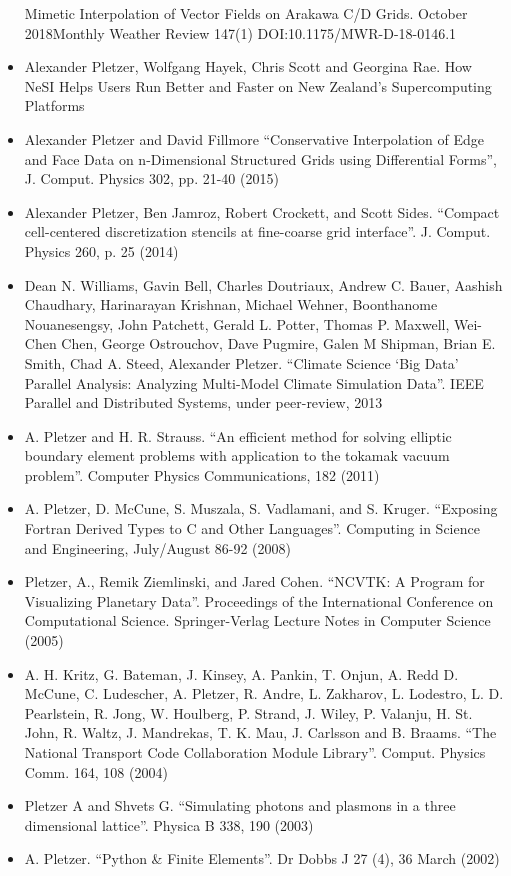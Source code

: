 \documentclass[10pt,a4paper]{altacv}
\begin{document}
\begin{itemize}
Mimetic Interpolation of Vector Fields on Arakawa C/D Grids. October 2018Monthly Weather Review 147(1)
DOI:10.1175/MWR-D-18-0146.1
   \item Alexander Pletzer, Wolfgang Hayek, Chris Scott and Georgina Rae.
How NeSI Helps Users Run Better and Faster on New Zealand's Supercomputing Platforms
\item Alexander Pletzer and David Fillmore “Conservative Interpolation of Edge and Face Data on n-Dimensional Structured Grids using Differential Forms”, J. Comput. Physics 302,  pp. 21-40 (2015)
\item Alexander Pletzer, Ben Jamroz, Robert Crockett, and Scott Sides. “Compact cell-centered discretization stencils at fine-coarse grid interface”. J. Comput. Physics 260, p. 25 (2014)
\item Dean N. Williams, Gavin Bell, Charles Doutriaux, Andrew C. Bauer, Aashish Chaudhary, Harinarayan Krishnan, Michael Wehner, Boonthanome Nouanesengsy, John Patchett, Gerald L. Potter, Thomas P. Maxwell, Wei-Chen Chen, George Ostrouchov, Dave Pugmire, Galen M Shipman, Brian E. Smith, Chad A. Steed, Alexander Pletzer. “Climate Science ‘Big Data’ Parallel Analysis: Analyzing Multi-Model Climate Simulation Data”. IEEE Parallel and Distributed Systems, under peer-review, 2013
\item A. Pletzer and H. R. Strauss. “An efficient method for solving elliptic boundary element problems with application to the tokamak vacuum problem”. Computer Physics Communications, 182 (2011)
\item A. Pletzer, D. McCune, S. Muszala, S. Vadlamani, and S. Kruger. “Exposing Fortran Derived Types to C and Other Languages”. Computing in Science and Engineering, July/August 86-92 (2008)
\item Pletzer, A., Remik Ziemlinski, and Jared Cohen. “NCVTK: A Program for Visualizing Planetary Data”. Proceedings of the International Conference on Computational Science. Springer-Verlag Lecture Notes in Computer Science (2005)
\item A. H. Kritz, G. Bateman, J. Kinsey, A. Pankin, T. Onjun, A. Redd D. McCune, C. Ludescher, A. Pletzer, R. Andre, L. Zakharov, L. Lodestro, L. D. Pearlstein, R. Jong, W. Houlberg, P. Strand, J. Wiley, P. Valanju, H. St. John, R. Waltz, J. Mandrekas, T. K. Mau, J. Carlsson and B. Braams. “The National Transport Code Collaboration Module Library”. Comput. Physics Comm. 164, 108 (2004)
\item Pletzer A and Shvets G. “Simulating photons and plasmons in a three dimensional lattice”. Physica B 338, 190 (2003)
\item A. Pletzer. ``Python \& Finite Elements''. Dr Dobbs J 27 (4), 36 March (2002)



  \end{itemize}


\divider
\medskip
\end{document}
